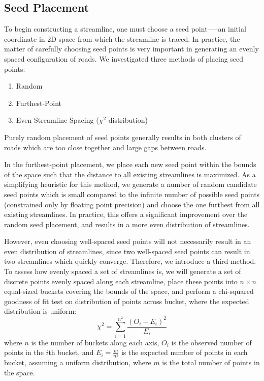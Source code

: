 \documentclass[twocolumn]{article}
\begin{document}
\subsection{Seed Placement}\label{seedpoints}
To begin constructing a streamline, one must choose a seed point—--an initial
coordinate in 2D space from which the streamline is traced. In practice, the
matter of carefully choosing seed points is very important in generating an
evenly spaced configuration of roads. We investigated three methods of placing
seed points:
\begin{enumerate}
    \item Random
    \item Furthest-Point
    \item Even Streamline Spacing ($\chi^2$ distribution)
\end{enumerate}

Purely random placement of seed points generally results in both clusters of
roads which are too close together and large gaps between roads.

In the furthest-point placement, we place each new seed point within the bounds
of the space such that the distance to all existing streamlines is maximized.
As a simplifying heuristic for this method, we generate a number of random
candidate seed points which is small compared to the infinite number of
possible seed points (constrained only by floating point precision) and choose
the one furthest from all existing streamlines. In practice, this offers a
significant improvement over the random seed placement, and results in a more
even distribution of streamlines.

However, even choosing well-spaced seed points will not necessarily result in
an even distribution of streamlines, since two well-spaced seed points can
result in two streamlines which quickly converge. Therefore, we introduce a
third method. To assess how evenly spaced a set of streamlines is, we will
generate a set of discrete points evenly spaced along each streamline, place
these points into $n\times n$ equal-sized buckets covering the bounds of the
space, and perform a chi-squared goodness of fit test on distribution of points
across bucket, where the expected distribution is uniform:
\[
    \chi^2 = \sum_{i=1}^{n^2} \frac{(O_i-E_i)^2}{E_i}
\]
where $n$ is the number of buckets along each axis, $O_i$ is the observed
number of points in the $i$th bucket, and $E_i=\frac{m}{n^2}$ is the
expected number of points in each bucket, assuming a uniform distribution,
where $m$ is the total number of points in the space.
\end{document}
